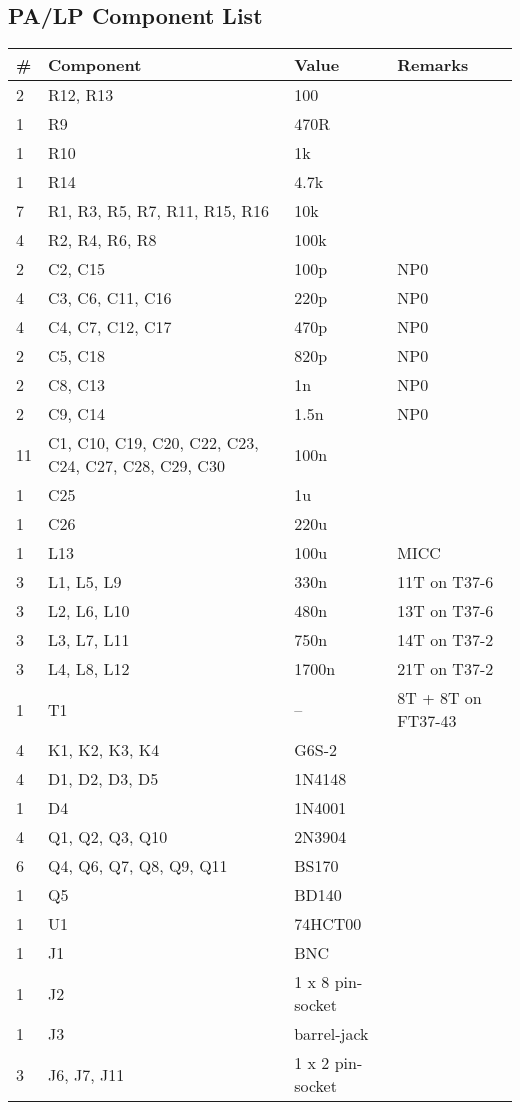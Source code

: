\documentclass[10pt, a4paper]{scrartcl}
\begin{document}
\subsection{PA/LP Component List}  \label{sec:pacomp}
\begin{longtable}{|l|p{6cm}|l|l|} \hline 
\# & Component & Value & Remarks \\ \hline 
2 & R12, R13 & 100 & \\
1 & R9 & 470R & \\
1 & R10 & 1k & \\
1 & R14 & 4.7k & \\
7 & R1, R3, R5, R7, R11, R15, R16 & 10k & \\
4 & R2, R4, R6, R8 & 100k & \\
2 & C2, C15 & 100p & NP0 \\
4 & C3, C6, C11, C16 & 220p & NP0 \\
4 & C4, C7, C12, C17 & 470p & NP0 \\
2 & C5, C18 & 820p & NP0 \\
2 & C8, C13 & 1n & NP0 \\
2 & C9, C14 & 1.5n & NP0 \\
11 & C1, C10, C19, C20, C22, C23, C24, C27, C28, C29, C30 & 100n & \\
1 & C25 & 1u & \\
1 & C26 & 220u & \\
1 & L13 & 100u & MICC \\
3 & L1, L5, L9 & 330n & 11T on T37-6 \\
3 & L2, L6, L10 & 480n & 13T on T37-6 \\
3 & L3, L7, L11 & 750n & 14T on T37-2 \\
3 & L4, L8, L12 & 1700n & 21T on T37-2 \\
1 & T1 & -- & 8T + 8T on FT37-43 \\
4 & K1, K2, K3, K4 & G6S-2 & \\
4 & D1, D2, D3, D5 & 1N4148 & \\
1 & D4 & 1N4001 & \\	
4 & Q1, Q2, Q3, Q10 & 2N3904 & \\
6 & Q4, Q6, Q7, Q8, Q9, Q11 & BS170 & \\
1 & Q5 & BD140 & \\
1 & U1 & 74HCT00 & \\
1 & J1 & BNC & \\
1 & J2 & 1 x 8 pin-socket & \\
1 & J3 & barrel-jack & \\
3 & J6, J7, J11 & 1 x 2 pin-socket & \\ \hline
\end{longtable}
\end{document}
